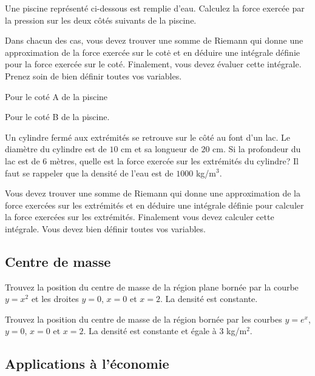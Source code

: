 \begin{question}[\eng]
Une piscine représenté ci-dessous est remplie d'eau.  Calculez
la force exercée par la pression sur les deux côtés suivants de la
piscine.

Dans chacun des cas, vous devez trouver une somme de Riemann qui donne
une approximation de la force exercée sur le cotė et en déduire une
intégrale définie pour la force exercée sur le coté.  Finalement, vous
devez évaluer cette intégrale.  Prenez soin de bien définir toutes vos
variables.

 Pour le coté A de la piscine

 Pour le coté B de la piscine.
\label{8Q28}
\end{question}

\begin{question}[\eng]
Un cylindre fermé aux extrémités se retrouve sur le côté au font d'un
lac.  Le diamètre du cylindre est de $10$ cm et sa longueur de $20$
cm.  Si la profondeur du lac est de $6$ mètres, quelle est la force
exercée sur les extrémités du cylindre?  Il faut se rappeler que la
densité de l'eau est de $1000$ kg/m$^3$.

Vous devez trouver une somme de Riemann qui donne une approximation de
la force exercées sur les extrémités et en déduire une intégrale définie pour
calculer la force exercées sur les extrémités. Finalement vous devez calculer
cette intégrale. Vous devez bien définir toutes vos variables.
\label{8Q29}
\end{question}

\subsection{Centre de masse}

\begin{question}[\eng]
Trouvez la position du centre de masse de la région plane bornée par la
courbe $y=x^2$ et les droites $y=0$, $x=0$ et $x=2$.  La densité est
constante. 
\label{8Q30}
\end{question}

\begin{question}[\eng]
Trouvez la position du centre de masse de la région bornée par les
courbes $y=e^x$, $y=0$, $x=0$ et $x=2$.   La densité est constante et
égale à $3$ kg/m$^2$.
\label{8Q31}
\end{question}

\subsection{Applications à l'économie}

